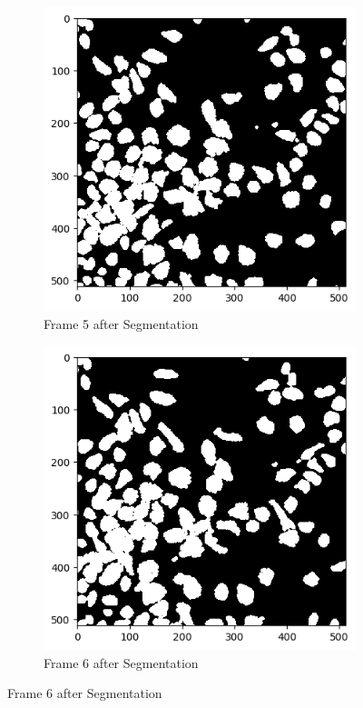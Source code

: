\documentclass{article}
\begin{document}
\begin{figure}[h!]
  \begin{subfigure}{0.4\textwidth}
    \includegraphics[width=\linewidth]{Report/Appendix_Images/Segmentation-A-Control/frame_5.png}
    \caption*{Frame 5 after Segmentation}
  \end{subfigure}
  \hfill
  \begin{subfigure}{0.4\textwidth}
    \includegraphics[width=\linewidth]{Report/Appendix_Images/Segmentation-A-Control/frame_6.png}
    \caption*{Frame 6 after Segmentation}
  \end{subfigure}
\end{figure}
\end{document}
